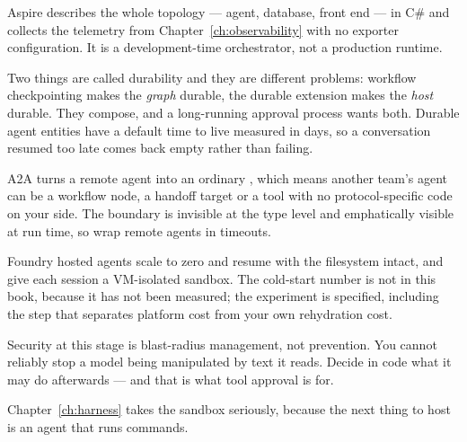 Aspire describes the whole topology --- agent, database, front end --- in C\# and
collects the telemetry from Chapter~\ref{ch:observability} with no exporter
configuration. It is a development-time orchestrator, not a production runtime.

Two things are called durability and they are different problems: workflow
checkpointing makes the \emph{graph} durable, the durable extension makes the
\emph{host} durable. They compose, and a long-running approval process wants
both. Durable agent entities have a default time to live measured in days, so a
conversation resumed too late comes back empty rather than failing.

A2A turns a remote agent into an ordinary , which means another
team's agent can be a workflow node, a handoff target or a tool with no
protocol-specific code on your side. The boundary is invisible at the type level
and emphatically visible at run time, so wrap remote agents in timeouts.

Foundry hosted agents scale to zero and resume with the filesystem intact, and
give each session a VM-isolated sandbox. The cold-start number is not in this
book, because it has not been measured; the experiment is specified, including
the step that separates platform cost from your own rehydration cost.

Security at this stage is blast-radius management, not prevention. You cannot
reliably stop a model being manipulated by text it reads. Decide in code what it
may do afterwards --- and that is what tool approval is for.

Chapter~\ref{ch:harness} takes the sandbox seriously, because the next thing to
host is an agent that runs commands.
